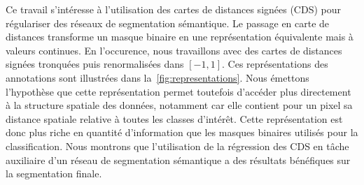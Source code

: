 Ce travail s'intéresse à l'utilisation des cartes de distances signées (CDS) pour régulariser des réseaux de segmentation sémantique. Le passage en carte de distances transforme un masque binaire en une représentation équivalente mais à valeurs continues. En l'occurence, nous travaillons avec des cartes de distances signées tronquées puis renormalisées dans $[-1,1]$. Ces représentations des annotations sont illustrées dans la~\cref{fig:representations}. Nous émettons l'hypothèse que cette représentation permet toutefois d'accéder plus directement à la structure spatiale des données, notamment car elle contient pour un pixel sa distance spatiale relative à toutes les classes d'intérêt. Cette représentation est donc plus riche en quantité d'information que les masques binaires utilisés pour la classification. Nous montrons que l'utilisation de la régression des CDS en tâche auxiliaire d'un réseau de segmentation sémantique a des résultats bénéfiques sur la segmentation finale.


